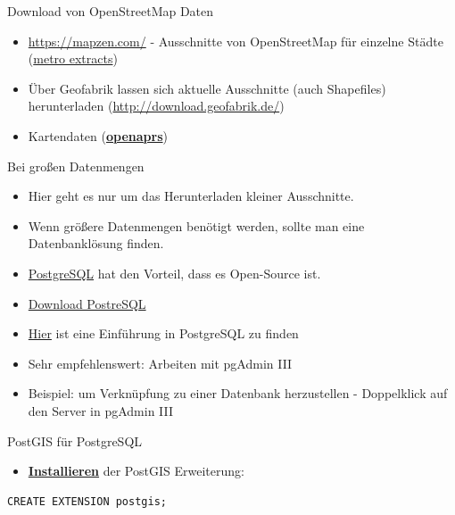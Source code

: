 \documentclass[ignorenonframetext,]{beamer}
\providecommand{\tightlist}{%
  \setlength{\itemsep}{0pt}\setlength{\parskip}{0pt}}
\begin{document}
\begin{frame}{Download von OpenStreetMap Daten}
\protect\hypertarget{download-von-openstreetmap-daten}{}

\begin{itemize}
\item
  \url{https://mapzen.com/} - Ausschnitte von OpenStreetMap für einzelne
  Städte (\href{https://mapzen.com/data/metro-extracts/}{metro
  extracts})
\item
  Über Geofabrik lassen sich aktuelle Ausschnitte (auch Shapefiles)
  herunterladen (\url{http://download.geofabrik.de/})
\item
  Kartendaten (\href{http://www.openaprs.net/}{\textbf{openaprs}})
\end{itemize}

\end{frame}

\begin{frame}[fragile]{Bei großen Datenmengen}
\protect\hypertarget{bei-groen-datenmengen}{}

\begin{itemize}
\item
  Hier geht es nur um das Herunterladen kleiner Ausschnitte.
\item
  Wenn größere Datenmengen benötigt werden, sollte man eine
  Datenbanklösung finden.
\item
  \href{http://www.postgresql.org/}{PostgreSQL} hat den Vorteil, dass es
  Open-Source ist.
\item
  \href{http://www.postgresql.org/download/windows/}{Download PostreSQL}
\item
  \href{https://datashenanigan.wordpress.com/2015/05/18/getting-started-with-postgresql-in-r/}{Hier}
  ist eine Einführung in PostgreSQL zu finden
\item
  Sehr empfehlenswert: Arbeiten mit pgAdmin III
\item
  Beispiel: um Verknüpfung zu einer Datenbank herzustellen - Doppelklick
  auf den Server in pgAdmin III
\end{itemize}

\begin{block}{PostGIS für PostgreSQL}

\begin{itemize}
\tightlist
\item
  \href{http://postgis.net/install/}{\textbf{Installieren}} der PostGIS
  Erweiterung:
\end{itemize}

\begin{verbatim}
CREATE EXTENSION postgis;
\end{verbatim}

\end{block}

\end{frame}
\end{document}
